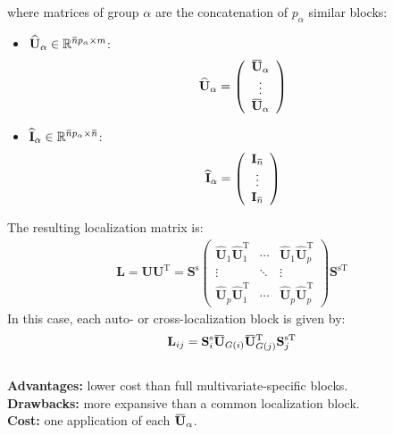 \documentclass[12pt]{scrartcl}
\newcommand{\overbar}[1]{\mkern 1.5mu\overline{\mkern-1.5mu#1\mkern-1.5mu}\mkern 1.5mu}
\begin{document}
where matrices of group $\alpha$ are the concatenation of $p_\alpha$ similar blocks:
\begin{itemize}
\item $\widehat{\mathbf{U}}_\alpha \in \mathbb{R}^{\overbar{n} p_\alpha \times m}$:
\begin{align}
\widehat{\mathbf{U}}_\alpha = \left( \begin{array}{c}
\overbar{\mathbf{U}}_\alpha\\
\vdots \\
\overbar{\mathbf{U}}_\alpha
\end{array} \right)
\end{align}
\item $\widehat{\mathbf{I}}_\alpha \in \mathbb{R}^{\overbar{n} p_\alpha \times \overbar{n}}$:
\begin{align}
\widehat{\mathbf{I}}_\alpha = \left( \begin{array}{c}
\mathbf{I}_{\overbar{n}}\\
\vdots \\
\mathbf{I}_{\overbar{n}}
\end{array} \right)
\end{align}
\end{itemize}
The resulting localization matrix is:
\begin{align}
\mathbf{L} = \mathbf{U} \mathbf{U}^\mathrm{T} = \mathbf{S}^\mathrm{s} \left( \begin{array}{ccc}
\widehat{\mathbf{U}}_1 \widehat{\mathbf{U}}_1^\mathrm{T} & \cdots & \widehat{\mathbf{U}}_1 \widehat{\mathbf{U}}_p^\mathrm{T} \\
\vdots & \ddots & \vdots  \\
\widehat{\mathbf{U}}_p \widehat{\mathbf{U}}_1^\mathrm{T} & \cdots & \widehat{\mathbf{U}}_p \widehat{\mathbf{U}}_p^\mathrm{T}
\end{array} \right) \mathbf{S}^{\mathrm{s} \mathrm{T}}
\end{align}
In this case, each auto- or cross-localization block is given by: 
\begin{align}
\mathbf{L}_{ij} = \mathbf{S}^\mathrm{s}_i \overbar{\mathbf{U}}_{G(i)} \overbar{\mathbf{U}}_{G(j)}^\mathrm{T} \mathbf{S}_j^{\mathrm{s} \mathrm{T}}
\end{align}
$  $\\
\textbf{Advantages:} lower cost than full multivariate-specific blocks.\\
\textbf{Drawbacks:} more expansive than a common localization block.\\
\textbf{Cost:} one application of each $\overbar{\mathbf{U}}_{\alpha}$.
\end{document}
